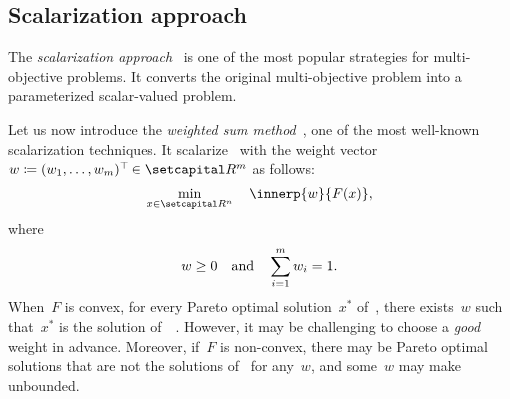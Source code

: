 \documentclass[../../main]{subfiles}
\begin{document}
\subsection{Scalarization approach}
The \emph{scalarization approach}~\cite{Gass1955,Geoffrion1968,Zadeh1963} is one of the most popular strategies for multi-objective problems.
It converts the original multi-objective problem into a parameterized scalar-valued problem.

Let us now introduce the \emph{weighted sum method}~\cite{Zadeh1963}, one of the most well-known scalarization techniques.
It scalarize~ with the weight vector~$w \coloneqq (w_1, \dots, w_m)^\T \in \setR^m$ as follows:
\begin{equation} \label{eq:weighted}
    \min_{x \in \setR^n} \quad \innerp{w}{F(x)}
,\end{equation} 
where
\begin{equation}
    w \ge 0 \quad \text{and} \quad \sum_{i = 1}^{m} w_i = 1
.\end{equation} 
When~$F$ is convex, for every Pareto optimal solution~$x^\ast$ of~, there exists~$w$ such that~$x^\ast$ is the solution of~~\cite{Miettinen1998}.
However, it may be challenging to choose a \emph{good} weight in advance.
Moreover, if~$F$ is non-convex, there may be Pareto optimal solutions that are not the solutions of~ for any~$w$, and some~$w$ may make~ unbounded.
\end{document}
